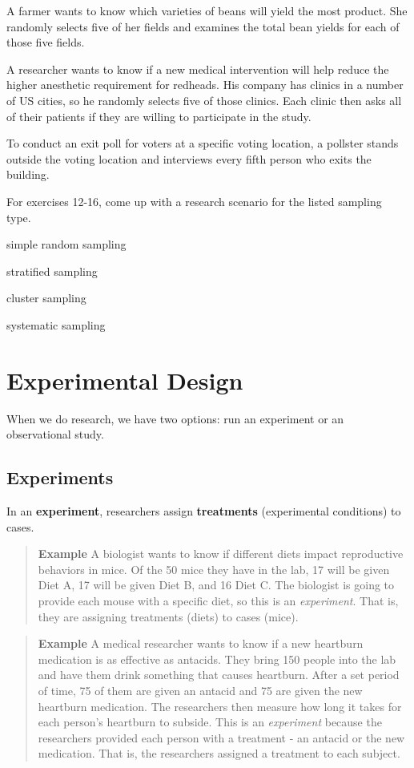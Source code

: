\documentclass[
]{book}
\begin{document}
A farmer wants to know which varieties of beans will yield the most product. She randomly selects five of her fields and examines the total bean yields for each of those five fields.

A researcher wants to know if a new medical intervention will help reduce the higher anesthetic requirement for redheads. His company has clinics in a number of US cities, so he randomly selects five of those clinics. Each clinic then asks all of their patients if they are willing to participate in the study.

To conduct an exit poll for voters at a specific voting location, a pollster stands outside the voting location and interviews every fifth person who exits the building.

For exercises 12-16, come up with a research scenario for the listed sampling type.

simple random sampling

stratified sampling

cluster sampling

systematic sampling

\section{Experimental Design}\label{experimental-design}

When we do research, we have two options: run an experiment or an observational study.

\subsection{Experiments}\label{experiments}

In an \textbf{experiment}, researchers assign \textbf{treatments} (experimental conditions) to cases.

\begin{quote}
\textbf{Example} A biologist wants to know if different diets impact reproductive behaviors in mice. Of the 50 mice they have in the lab, 17 will be given Diet A, 17 will be given Diet B, and 16 Diet C. The biologist is going to provide each mouse with a specific diet, so this is an \emph{experiment}. That is, they are assigning treatments (diets) to cases (mice).
\end{quote}

\begin{quote}
\textbf{Example} A medical researcher wants to know if a new heartburn medication is as effective as antacids. They bring 150 people into the lab and have them drink something that causes heartburn. After a set period of time, 75 of them are given an antacid and 75 are given the new heartburn medication. The researchers then measure how long it takes for each person's heartburn to subside. This is an \emph{experiment} because the researchers provided each person with a treatment - an antacid or the new medication. That is, the researchers assigned a treatment to each subject.
\end{quote}
\end{document}
